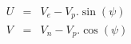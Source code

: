 \begin{eqnarray*}
U & = & V_e - V_p . \sin (\psi) \\
V & = & V_n - V_p . \cos (\psi) 
\end{eqnarray*}
